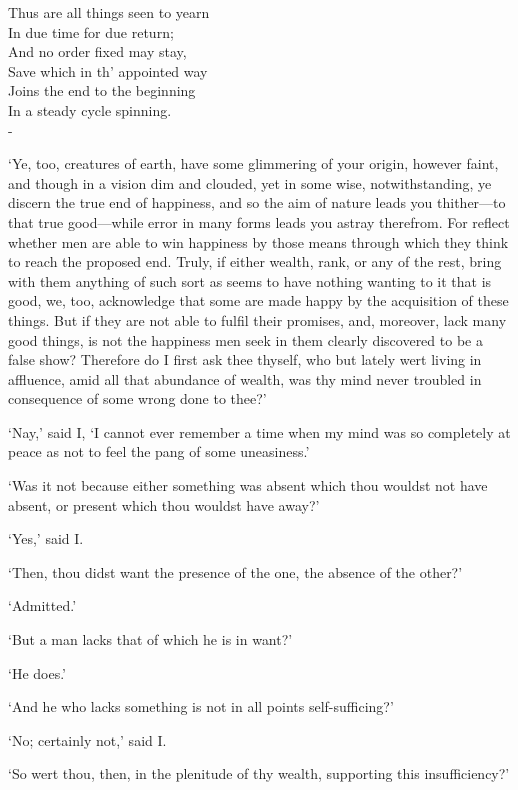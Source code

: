 \documentclass[12pt]{book}
\newenvironment{ipoem}[1]%
  {\setcounter{poemindentevery}{#1}\begin{poem}\small}%
  {\end{poem}\setcounter{poemindentevery}{0}}
\begin{document}
\begin{ipoem}{0}
    Thus are all things seen to yearn \\
    In due time for due return; \\
    And no order fixed may stay, \\
    Save which in th' appointed way \\
    Joins the end to the beginning \\
    In a steady cycle spinning. \\-
\end{ipoem}

`Ye, too, creatures of earth, have some glimmering of your origin,
however faint, and though in a vision dim and clouded, yet in some wise,
notwithstanding, ye discern the true end of happiness, and so the aim of
nature leads you thither---to that true good---while error in many forms
leads you astray therefrom. For reflect whether men are able to win
happiness by those means through which they think to reach the proposed
end. Truly, if either wealth, rank, or any of the rest, bring with them
anything of such sort as seems to have nothing wanting to it that is
good, we, too, acknowledge that some are made happy by the acquisition
of these things. But if they are not able to fulfil their promises, and,
moreover, lack many good things, is not the happiness men seek in them
clearly discovered to be a false show? Therefore do I first ask thee
thyself, who but lately wert living in affluence, amid all that
abundance of wealth, was thy mind never troubled in consequence of some
wrong done to thee?'

`Nay,' said I, `I cannot ever remember a time when my mind was so
completely at peace as not to feel the pang of some uneasiness.'

`Was it not because either something was absent which thou wouldst not
have absent, or present which thou wouldst have away?'

`Yes,' said I.

`Then, thou didst want the presence of the one, the absence of the
other?'

`Admitted.'

`But a man lacks that of which he is in want?'

`He does.'

`And he who lacks something is not in all points self-sufficing?'

`No; certainly not,' said I.

`So wert thou, then, in the plenitude of thy wealth, supporting this
insufficiency?'
\end{document}
